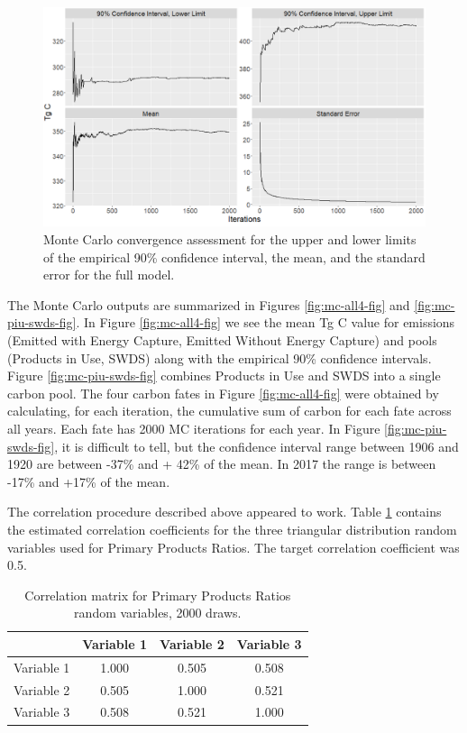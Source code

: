 \documentclass[
  openany]{book}
\begin{document}
\begin{figure}
\includegraphics[width=1\linewidth]{images/MC_conv} \caption{Monte Carlo convergence assessment for the upper and lower limits of the empirical 90\% confidence interval, the mean, and the standard error for the full model.}\label{fig:mc-conv-fig}
\end{figure}

The Monte Carlo outputs are summarized in Figures \ref{fig:mc-all4-fig} and \ref{fig:mc-piu-swds-fig}. In Figure \ref{fig:mc-all4-fig} we see the mean Tg C value for emissions (Emitted with Energy Capture, Emitted Without Energy Capture) and pools (Products in Use, SWDS) along with the empirical 90\% confidence intervals. Figure \ref{fig:mc-piu-swds-fig} combines Products in Use and SWDS into a single carbon pool. The four carbon fates in Figure \ref{fig:mc-all4-fig} were obtained by calculating, for each iteration, the cumulative sum of carbon for each fate across all years. Each fate has 2000 MC iterations for each year. In Figure \ref{fig:mc-piu-swds-fig}, it is difficult to tell, but the confidence interval range between 1906 and 1920 are between -37\% and + 42\% of the mean. In 2017 the range is between -17\% and +17\% of the mean.

The correlation procedure described above appeared to work. Table \ref{tab:ppr-cor-tab} contains the estimated correlation coefficients for the three triangular distribution random variables used for Primary Products Ratios. The target correlation coefficient was 0.5.

\begin{table}

\caption{\label{tab:ppr-cor-tab}Correlation matrix for Primary Products Ratios random variables, 2000 draws.}
\centering
\begin{tabular}[t]{lccc}
\toprule
  & Variable 1 & Variable 2 & Variable 3\\
\midrule
Variable 1 & 1.000 & 0.505 & 0.508\\
Variable 2 & 0.505 & 1.000 & 0.521\\
Variable 3 & 0.508 & 0.521 & 1.000\\
\bottomrule
\end{tabular}
\end{table}
\end{document}
